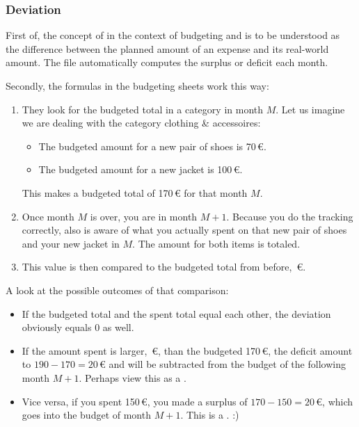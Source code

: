 \subsubsection{Deviation}
\label{subsubsec:budgeting-deviation}

First of, the concept of  in the context of budgeting and \tfn is to be understood as the difference between the planned amount of an expense and its real-world amount.
The file automatically computes the surplus or deficit each month.

Secondly, the formulas in the budgeting sheets work this way:
\begin{enumerate}
	\item They look for the budgeted total in a category in month \( M \).
	Let us imagine we are dealing with the category clothing \& accessoires:
	\begin{itemize}
		\item The budgeted amount for a new pair of shoes is 70\,€.
		\item The budgeted amount for a new jacket is 100\,€.
	\end{itemize}
	This makes a budgeted total of 170\,€ for that month \( M \).
	\item Once month \( M \) is over, you are in month \( M+1 \).
	Because you do the tracking correctly, \tfn also is aware of what you actually spent on that new pair of shoes and your new jacket in \( M \).
	The amount for both items is totaled.
	\item This value is then compared to the budgeted total from before, \,€.
\end{enumerate}

A look at the possible outcomes of that comparison:
\begin{itemize}
	\item If the budgeted total and the spent total equal each other, the deviation obviously equals 0 as well.
	\item If the amount spent is larger, \,€, than the budgeted 170\,€, the deficit amount to \( 190-170 = 20\)\,€ and will be subtracted from the budget of the following month \( M+1 \).
	Perhaps view this as a .
	\item Vice versa, if you spent 150\,€, you made a surplus of \( 170-150 = 20 \)\,€, which goes into the budget of month \( M+1 \).
	This is a . :)
\end{itemize}

